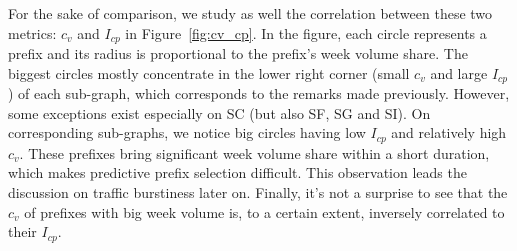 For the sake of comparison, we study as well the correlation between these two metrics: $c_v$ %
and $I_{cp}$ in Figure~\ref{fig:cv_cp}.
In the figure, each circle represents a prefix and its radius is proportional to the prefix's week volume share.
The biggest circles mostly concentrate in the lower right corner (small $c_v$ and large $I_{cp}$) of each sub-graph, which corresponds to the remarks made previously.
However, some exceptions exist especially on SC (but also SF, SG and SI).
On corresponding sub-graphs, we notice big circles having low $I_{cp}$ and relatively high $c_v$.
These prefixes bring significant week volume share within a short duration, which makes predictive prefix selection difficult. 
This observation leads the discussion on traffic burstiness later on.
Finally, it's not a surprise to see that the $c_v$ of prefixes with big week volume is, to a certain extent, inversely correlated to their $I_{cp}$.

